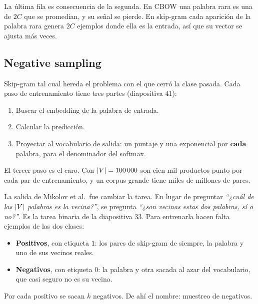 \documentclass[11pt,letterpaper]{article}
\begin{document}
La última fila es consecuencia de la segunda. En CBOW una palabra rara
es una de $2C$ que se promedian, y su señal se pierde. En skip-gram
cada aparición de la palabra rara genera $2C$ ejemplos donde ella es
la entrada, así que su vector se ajusta más veces.


\subsection*{Negative sampling}

Skip-gram tal cual hereda el problema con el que cerró la clase
pasada. Cada paso de entrenamiento tiene tres partes
(diapositiva $41$):

\begin{enumerate}[itemsep=0.2em]
    \item Buscar el embedding de la palabra de entrada.
    \item Calcular la predicción.
    \item Proyectar al vocabulario de salida: un puntaje y una
          exponencial por \textbf{cada} palabra, para el denominador
          del softmax.
\end{enumerate}

El tercer paso es el caro. Con $\left\lvert V \right\rvert = 100\,000$ son cien mil
productos punto por cada par de entrenamiento, y un corpus grande
tiene miles de millones de pares.

La salida de Mikolov et al.\ fue cambiar la tarea. En lugar de
preguntar \textit{``¿cuál de las $\left\lvert V \right\rvert$ palabras es la vecina?''},
se pregunta \textit{``¿son vecinas estas dos palabras, sí o no?''}. Es
la tarea binaria de la diapositiva $33$. Para entrenarla hacen falta
ejemplos de las dos clases:

\begin{itemize}[itemsep=0.3em]
    \item \textbf{Positivos}, con etiqueta $1$: los pares de skip-gram
          de siempre, la palabra y uno de sus vecinos reales.
    \item \textbf{Negativos}, con etiqueta $0$: la palabra y otra
          sacada al azar del vocabulario, que casi seguro no es su
          vecina.
\end{itemize}

Por cada positivo se sacan $k$ negativos. De ahí el nombre: muestreo
de negativos.
\end{document}
